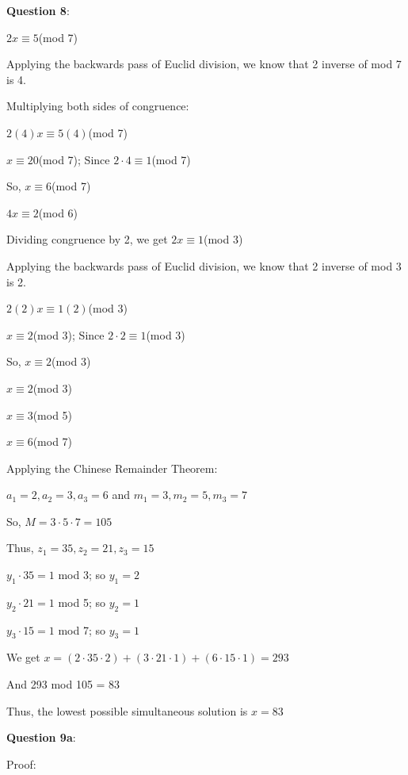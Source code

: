\documentclass{article} %
\newcommand{\question}[2][]{\begin{flushleft}
        \textbf{Question #1}: #2

\end{flushleft}}
\begin{document}
    \question[8]{}

    $2x \equiv 5$(mod 7)
    
    Applying the backwards pass of Euclid division, we know that 2 inverse of mod 7 is 4.

    Multiplying both sides of congruence:

    $2(4)x \equiv 5(4)$(mod 7)

    $x \equiv 20$(mod 7); Since $2 \cdot 4 \equiv 1$(mod 7)

    So, $x \equiv 6$(mod 7)

    \vspace{0.2cm}

    $4x \equiv 2$(mod 6)

    Dividing congruence by 2, we get $2x \equiv 1$(mod 3)

    Applying the backwards pass of Euclid division, we know that 2 inverse of mod 3 is 2.

    $2(2)x \equiv 1(2)$(mod 3)

    $x \equiv 2$(mod 3); Since $2 \cdot 2 \equiv 1$(mod 3)

    So, $x \equiv 2$(mod 3)

    \vspace{0.2cm}
    
    $x \equiv 2$(mod 3)
    
    $x \equiv 3$(mod 5)
    
    $x \equiv 6$(mod 7)

    Applying the Chinese Remainder Theorem:

    $a_1 = 2, a_2 = 3, a_3 = 6$ and $m_1 = 3, m_2 = 5, m_3 = 7$

    So, $M = 3 \cdot 5 \cdot 7 = 105$

    Thus, $z_1 = 35, z_2 = 21, z_3 = 15$

    $y_1 \cdot 35 = 1$ mod 3; so $y_1 = 2$

    $y_2 \cdot 21 = 1$ mod 5; so $y_2 = 1$

    $y_3 \cdot 15 = 1$ mod 7; so $y_3 = 1$

    We get $x = (2 \cdot 35 \cdot 2) + (3 \cdot 21 \cdot 1) + (6 \cdot 15 \cdot 1) = 293$

    And 293 mod 105 = 83

    Thus, the lowest possible simultaneous solution is $x = 83$

    \newpage

    \question[9a]{}

    Proof:
\end{document}
